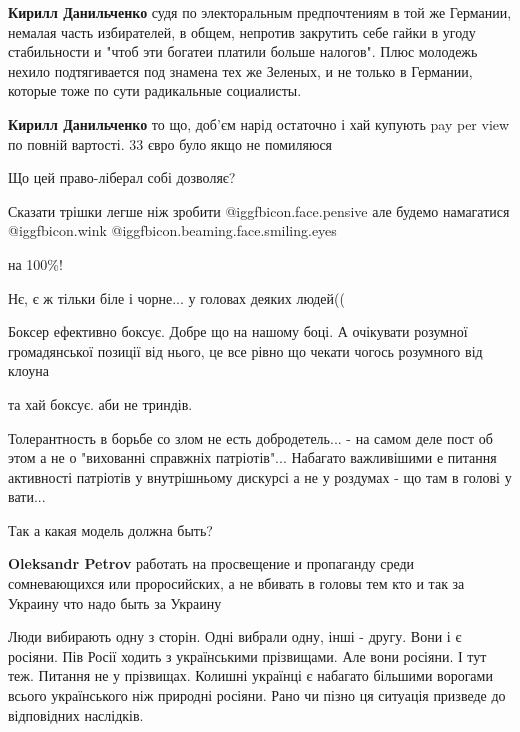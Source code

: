 \begin{itemize}
\begin{itemize}
\textbf{Кирилл Данильченко} судя по электоральным предпочтениям в той же Германии, немалая часть избирателей, в общем, непротив закрутить себе гайки в угоду стабильности и "чтоб эти богатеи платили больше налогов". Плюс молодежь нехило подтягивается под знамена тех же Зеленых, и не только в Германии, которые тоже по сути радикальные социалисты.

\textbf{Кирилл Данильченко} то що, доб'єм нарід остаточно і хай купують pay per view по повній вартості. 33 євро було якщо не помиляюся
\end{itemize} %

Що цей право-ліберал собі дозволяє?

Сказати трішки легше ніж зробити  @igg{fbicon.face.pensive}  але будемо намагатися  @igg{fbicon.wink}  @igg{fbicon.beaming.face.smiling.eyes} 

на 100\%!

Нє, є ж тільки біле і чорне... у головах деяких людей((


Боксер ефективно боксує. Добре що на нашому боці. А очікувати розумної
громадянської позиції від нього, це все рівно що чекати чогось розумного від
клоуна

\begin{itemize} %
та хай боксує. аби не триндів.
\end{itemize} %


Толерантность в борьбе со злом не есть добродетель... - на самом деле пост об
этом а не о "вихованні справжніх патріотів"... Набагато важливішими е питання
активності патріотів у внутрішньому дискурсі а не у роздумах - що там в голові
у вати...

Так а какая модель должна быть?

\begin{itemize} %
\textbf{Oleksandr Petrov} работать на просвещение и пропаганду среди сомневающихся или проросийских, а не вбивать в головы тем кто и так за Украину что надо быть за Украину
\end{itemize} %


Люди вибирають одну з сторін. Одні вибрали одну, інші - другу.
Вони і є росіяни. Пів Росії ходить з українськими прізвищами. Але вони росіяни. І тут теж.
Питання не у прізвищах. Колишні українці є набагато більшими ворогами всього українського ніж природні росіяни. Рано чи пізно ця ситуація призведе до відповідних наслідків.


\end{itemize}
